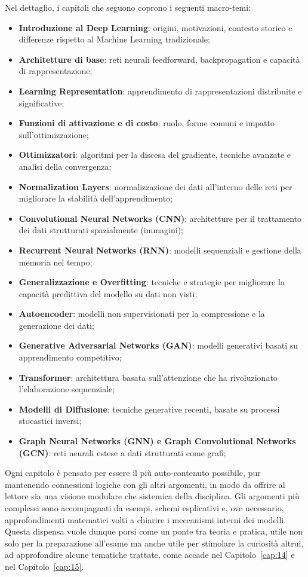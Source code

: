 Nel dettaglio, i capitoli che seguono coprono i seguenti macro-temi:
\begin{itemize}
    \item \textbf{Introduzione al Deep Learning}: origini, motivazioni, contesto storico e differenze rispetto al Machine Learning tradizionale;
    \item \textbf{Architetture di base}: reti neurali feedforward, backpropagation e capacità di rappresentazione;
    \item \textbf{Learning Representation}: apprendimento di rappresentazioni distribuite e significative;
    \item \textbf{Funzioni di attivazione e di costo}: ruolo, forme comuni e impatto sull’ottimizzazione;
    \item \textbf{Ottimizzatori}: algoritmi per la discesa del gradiente, tecniche avanzate e analisi della convergenza;
    \item \textbf{Normalization Layers}: normalizzazione dei dati all’interno delle reti per migliorare la stabilità dell’apprendimento;
    \item \textbf{Convolutional Neural Networks (CNN)}: architetture per il trattamento dei dati strutturati spazialmente (immagini);
    \item\textbf{Recurrent Neural Networks (RNN)}: modelli sequenziali e gestione della memoria nel tempo;
    \item\textbf{Generalizzazione e Overfitting}: tecniche e strategie per migliorare la capacità predittiva del modello su dati non visti;
    \item\textbf{Autoencoder}: modelli non supervisionati per la compressione e la generazione dei dati;
    \item\textbf{Generative Adversarial Networks (GAN)}: modelli generativi basati su apprendimento competitivo;
    \item\textbf{Transformer}: architettura basata sull’attenzione che ha rivoluzionato l’elaborazione sequenziale;
    \item\textbf{Modelli di Diffusione}: tecniche generative recenti, basate su processi stocastici inversi;
    \item\textbf{Graph Neural Networks (GNN) e Graph Convolutional Networks (GCN)}: reti neurali estese a dati strutturati come grafi;
\end{itemize}
Ogni capitolo è pensato per essere il più auto-contenuto possibile, pur mantenendo connessioni logiche con gli altri argomenti, in modo da offrire al lettore sia una visione modulare che sistemica della disciplina. Gli argomenti più complessi sono accompagnati da esempi, schemi esplicativi e, ove necessario, approfondimenti matematici volti a chiarire i meccanismi interni dei modelli. Questa dispensa vuole dunque porsi come un ponte tra teoria e pratica, utile non solo per la preparazione all’esame ma anche utile per stimolare la curiosità altrui, ad approfondire alcune tematiche trattate, come accade nel Capitolo~\ref{cap:14} e nel Capitolo~\ref{cap:15}.


